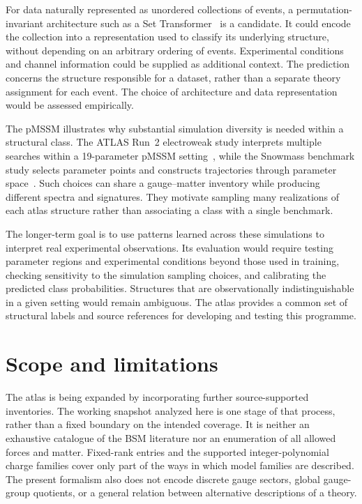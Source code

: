 For data naturally represented as unordered collections of events, a permutation-invariant architecture such as a Set Transformer~\cite{SetTransformer} is a candidate. It could encode the collection into a representation used to classify its underlying structure, without depending on an arbitrary ordering of events. Experimental conditions and channel information could be supplied as additional context. The prediction concerns the structure responsible for a dataset, rather than a separate theory assignment for each event. The choice of architecture and data representation would be assessed empirically.

The pMSSM illustrates why substantial simulation diversity is needed within a structural class. The ATLAS Run~2 electroweak study interprets multiple searches within a 19-parameter pMSSM setting~\cite{ATLASpMSSM}, while the Snowmass benchmark study selects parameter points and constructs trajectories through parameter space~\cite{Snowmass}. Such choices can share a gauge--matter inventory while producing different spectra and signatures. They motivate sampling many realizations of each atlas structure rather than associating a class with a single benchmark.

The longer-term goal is to use patterns learned across these simulations to interpret real experimental observations. Its evaluation would require testing parameter regions and experimental conditions beyond those used in training, checking sensitivity to the simulation sampling choices, and calibrating the predicted class probabilities. Structures that are observationally indistinguishable in a given setting would remain ambiguous. The atlas provides a common set of structural labels and source references for developing and testing this programme.

\section{Scope and limitations}
\label{sec:limitations}

The atlas is being expanded by incorporating further source-supported inventories. The working snapshot analyzed here is one stage of that process, rather than a fixed boundary on the intended coverage. It is neither an exhaustive catalogue of the BSM literature nor an enumeration of all allowed forces and matter. Fixed-rank entries and the supported integer-polynomial charge families cover only part of the ways in which model families are described. The present formalism also does not encode discrete gauge sectors, global gauge-group quotients, or a general relation between alternative descriptions of a theory.

